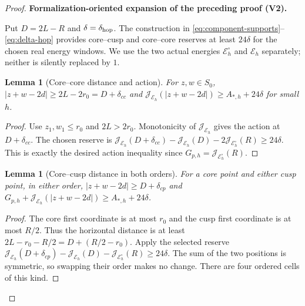 \documentclass[11pt]{article}
\newtheorem{lemma}[theorem]{Lemma}
\newcommand{\formalisationparentid}{X}
\newenvironment{formalisationaddition}[1]{\par\medskip\begingroup\color{blue}\def\formalisationparentid{#1}\setcounter{formalizationsublemma}{0}\let\lemma\formalizationsublemma\let\endlemma\endformalizationsublemma
  \def\Eo{\mathcal E_h^\circ}\def\EE{\mathcal E_h}\def\phio{\phi_h^\circ}\def\phih{\phi_h}\def\Ho{H_h^{\rm atom}(v^\circ)}\def\Ha{H_h^{\rm atom}}\def\HL{H_h^{L}}\def\Dh{D_h}\def\Log{\operatorname{Log}}\def\ellh{\ell_h}\def\Gp{G_{p,h}}\def\Ast{A_{*,h}}\def\ahat{\widehat{\mathfrak a}_h}\def\ah{\mathfrak a_h}\def\rh{\widehat\rho_h}\def\deltah{\widehat\delta_h}\def\oldref##1{\textup{(##1)}}\def\interface##1{\par\noindent\textit{Analytical interface used here.} ##1\par}\def\finish{\par\noindent\textit{Conclusion of the formalization-oriented expansion.} }\par\noindent\textbf{Formalization-oriented expansion of the preceding proof (V2).}\par\smallskip
}{\par\endgroup\medskip
}
\newcommand{\cJ}{\mathcal J}
\begin{document}
\begin{proof}
\begin{formalisationaddition}{T5.5}
Put $D=2L-R$ and $\delta=\delta_{\rm hop}$. The construction in \eqref{eq:component-supports}--\eqref{eq:delta-hop} provides core--cusp and core--core reserves at least $24\delta$ for the chosen real energy windows. We use the two actual energies $\Eo$ and $\mathcal E_h$ separately; neither is silently replaced by $1$.

\begin{lemma}[Core--core distance and action]\label{sublemma:T5-5-core-core}
For $z,w\in S_0$,
$|z+w-2d|\ge2L-2r_0=D+\delta_{cc}$ and
$\cJ_{\mathcal E_h}(|z+w-2d|)\ge A_{*,h}+24\delta$ for small $h$.
\end{lemma}
\begin{proof}
Use $z_1,w_1\le r_0$ and $2L>2r_0$. Monotonicity of $\cJ_{\mathcal E_h}$ gives the action at $D+\delta_{cc}$. The chosen reserve is
$\cJ_{\mathcal E_h}(D+\delta_{cc})-\cJ_{\mathcal E_h}(D)-2\cJ_{\Eo}(R)\ge24\delta$.
This is exactly the desired action inequality since $G_{p,h}=\cJ_{\Eo}(R)$.
\end{proof}

\begin{lemma}[Core--cusp distance in both orders]\label{sublemma:T5-5-core-cusp}
For a core point and either cusp point, in either order,
$|z+w-2d|\ge D+\delta_{cp}$ and
$G_{p,h}+\cJ_{\mathcal E_h}(|z+w-2d|)\ge A_{*,h}+24\delta$.
\end{lemma}
\begin{proof}
The core first coordinate is at most $r_0$ and the cusp first coordinate is at most $R/2$. Thus the horizontal distance is at least
$2L-r_0-R/2=D+(R/2-r_0)$. Apply the selected reserve
$\cJ_{\mathcal E_h}(D+\delta_{cp})-\cJ_{\mathcal E_h}(D)-\cJ_{\Eo}(R)\ge24\delta$.
The sum of the two positions is symmetric, so swapping their order makes no change. There are four ordered cells of this kind.
\end{proof}


\end{formalisationaddition}
\end{proof}
\end{document}
